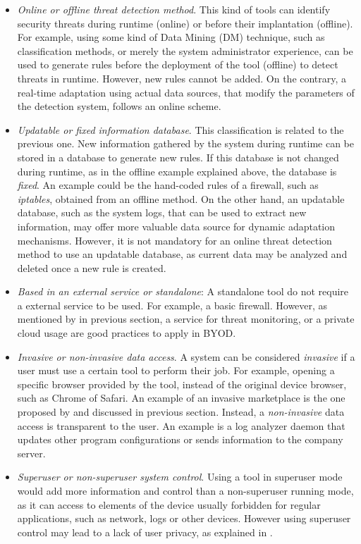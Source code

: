 \begin{itemize}
\item {\em Online or offline threat detection method}. This kind of tools can identify security threats during runtime (online) or before their implantation (offline). For example, using some kind of Data Mining (DM) technique, such as classification methods, or merely the system administrator experience, can be used to generate rules before the deployment of the tool (offline) to detect threats in runtime. However, new rules cannot be added. On the contrary, a real-time adaptation using actual data sources, that modify the parameters of the detection system, follows an online scheme.
\item {\em Updatable or fixed information database}. This classification is related to the previous one. New information gathered by the system during runtime can be stored in a database to generate new rules. If this database is not changed during runtime, as in the offline example explained above, the database is {\em fixed}. An example could be the hand-coded rules of a firewall, such as {\em iptables}, obtained from an offline method. On the other hand, an updatable database, such as the system logs, that can be used to extract new information, may offer more valuable data source for dynamic adaptation mechanisms. However, it is not mandatory for an online threat detection method to use an updatable database, as current data may be analyzed and deleted once a new rule is created. 
\item {\em Based in an external service or standalone}: A standalone tool do not require a external service to be used. For example, a basic firewall. However, as mentioned by \cite{Romer14BestPractices} in previous section, a service for threat monitoring, or a private cloud usage are good practices to apply in BYOD.
\item {\em Invasive or non-invasive data access}. A system can be considered {\em invasive} if a user must use a certain tool to perform their job. For example, opening a specific browser provided by the tool, instead of the original device browser, such as Chrome of Safari. An example of an invasive marketplace is the one proposed by \cite{Armando14metamarket} and discussed in previous section. Instead, a {\em non-invasive} data access is transparent to the user. An example is a log analyzer daemon that updates other program configurations or sends information to the company server.
\item {\em Superuser or non-superuser system control}. Using a tool in superuser mode would add more information and control than a non-superuser running mode, as it can access to elements of the device usually forbidden for regular applications, such as network, logs or other devices. However using superuser control may lead to a lack of user privacy, as explained in \cite{Gessner13userfriendly}.
\end{itemize}

